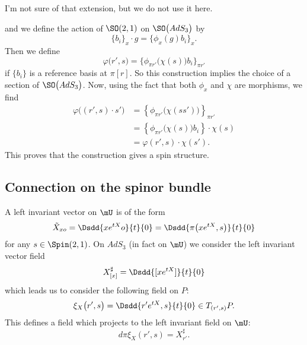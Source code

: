 \begin{probleme}
    I'm not sure of that extension, but we do not use it here.
\end{probleme}


and we define the action of $\SO(2,1)$ on $\SO\big( AdS_3 \big)$ by
\begin{equation}
\{ b_{i} \}_{x}\cdot g=\{ \phi_{x}(g)b_{i} \}_{x}.
\end{equation}
Then we define
\begin{equation}
  \varphi\big( r',s \big)=\{ \phi_{\pi r'}\big( \chi(s) \big)b_{i} \}_{\pi r'}
\end{equation}
 if $\{ b_{i} \}$ is a reference basis at $\pi[r]$. So this construction implies the choice of a section of $\SO\big( AdS_3 \big)$. Now, using the fact that both $\phi_{x}$ and $\chi$ are morphisms, we find 
\begin{equation}
\begin{split}
\varphi\big( (r',s)\cdot s' \big)&=\left\{ \phi_{\pi r'}\big( \chi(ss') \big) \right\}_{\pi r'}\\
            &=\left\{ \phi_{\pi r'}\big( \chi(s) \big)b_{i} \right\}\cdot\chi(s)\\
            &=\varphi(r',s)\cdot\chi(s').
\end{split}
\end{equation}
This proves that the construction gives a spin structure.

\subsection{Connection on the spinor bundle}

A left invariant vector on $\mU$ is of the form
\[ 
  \tilde X_{xo}=\Dsdd{ x e^{tX}o }{t}{0}
        =\Dsdd{ \pi\big( x e^{tX},s \big) }{t}{0}
\]
for any $s\in\Spin(2,1)$. On $AdS_3$ (in fact on $\mU$) we consider the left invariant vector field
\begin{equation}
X^{\sharp}_{[x]}=\Dsdd{ [x e^{tX}] }{t}{0}
\end{equation}
which leads us to consider the following field on $P$:
\begin{equation}
\xi_{X}\big( r',s \big)=\Dsdd{ r' e^{tX},s }{t}{0}\in T_{( r',s )}P.
\end{equation}
This defines a field which projects to the left invariant field on $\mU$:
\begin{equation}   \label{eq_xiXprojXsharp}
d\pi\xi_{X}(r',s)=X^{\sharp}_{r'}.
\end{equation}  


